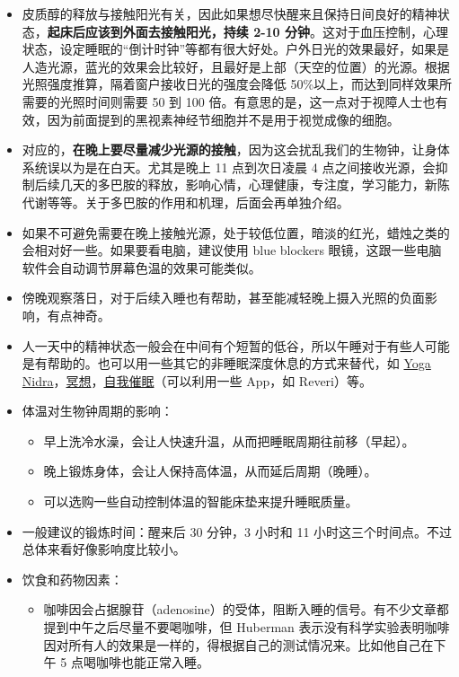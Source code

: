 \documentclass{report}
\begin{document}
\begin{itemize}
    \item 皮质醇的释放与接触阳光有关，因此如果想尽快醒来且保持日间良好的精神状态，\textbf{起床后应该到外面去接触阳光，持续 2-10 分钟}。这对于血压控制，心理状态，设定睡眠的“倒计时钟”等都有很大好处。户外日光的效果最好，如果是人造光源，蓝光的效果会比较好，且最好是上部（天空的位置）的光源。根据光照强度推算，隔着窗户接收日光的强度会降低 50\%以上，而达到同样效果所需要的光照时间则需要 50 到 100 倍。有意思的是，这一点对于视障人士也有效，因为前面提到的黑视素神经节细胞并不是用于视觉成像的细胞。
    \item 对应的，\textbf{在晚上要尽量减少光源的接触}，因为这会扰乱我们的生物钟，让身体系统误以为是在白天。尤其是晚上 11 点到次日凌晨 4 点之间接收光源，会抑制后续几天的多巴胺的释放，影响心情，心理健康，专注度，学习能力，新陈代谢等等。关于多巴胺的作用和机理，后面会再单独介绍。
    \item 如果不可避免需要在晚上接触光源，处于较低位置，暗淡的红光，蜡烛之类的会相对好一些。如果要看电脑，建议使用 blue blockers 眼镜，这跟一些电脑软件会自动调节屏幕色温的效果可能类似。
    \item 傍晚观察落日，对于后续入睡也有帮助，甚至能减轻晚上摄入光照的负面影响，有点神奇。
    \item 人一天中的精神状态一般会在中间有个短暂的低谷，所以午睡对于有些人可能是有帮助的。也可以用一些其它的非睡眠深度休息的方式来替代，如 \href{https://youtu.be/M0u9GST_j3s}{Yoga Nidra}，\href{https://www.headspace.com/}{冥想}，\href{https://www.youtube.com/c/MichaelSealey}{自我催眠}（可以利用一些 App，如 Reveri）等。
    \item 体温对生物钟周期的影响：
    \begin{itemize}
        \item 早上洗冷水澡，会让人快速升温，从而把睡眠周期往前移（早起）。
        \item 晚上锻炼身体，会让人保持高体温，从而延后周期（晚睡）。
        \item 可以选购一些自动控制体温的智能床垫来提升睡眠质量。
    \end{itemize}
    \item 一般建议的锻炼时间：醒来后 30 分钟，3 小时和 11 小时这三个时间点。不过总体来看好像影响度比较小。
    \item 饮食和药物因素：
    \begin{itemize}
        \item 咖啡因会占据腺苷（adenosine）的受体，阻断入睡的信号。有不少文章都提到中午之后尽量不要喝咖啡，但 Huberman 表示没有科学实验表明咖啡因对所有人的效果是一样的，得根据自己的测试情况来。比如他自己在下午 5 点喝咖啡也能正常入睡。

\end{itemize}
\end{itemize}
\end{document}
